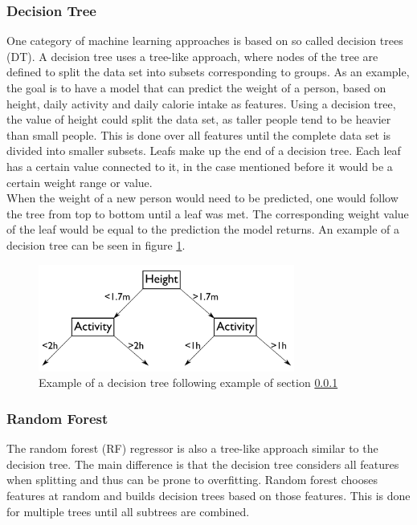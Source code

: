 \subsubsection{Decision Tree}
\label{sec:dt}
One category of machine learning approaches is based on so called decision trees (DT). A decision tree uses a tree-like approach, where nodes of the tree are defined to split the data set into subsets corresponding to groups. As an example, the goal is to have a model that can predict the weight of a person, based on height, daily activity and daily calorie intake as features. Using a decision tree, the value of height could split the data set, as taller people tend to be heavier than small people. This is done over all features until the complete data set is divided into smaller subsets. Leafs make up the end of a decision tree. Each leaf has a certain value connected to it, in the case mentioned before it would be a certain weight range or value. \\
When the weight of a new person would need to be predicted, one would follow the tree from top to bottom until a leaf was met. The corresponding weight value of the leaf would be equal to the prediction the model returns. An example of a decision tree can be seen in figure \ref{fig:dtdiag}.

\begin{figure}[h]
\centering
\includegraphics[width=0.75\textwidth]{figures/dtdiag}
\caption{Example of a decision tree following example of section \ref{sec:dt}}
\label{fig:dtdiag}
\end{figure}

\subsubsection{Random Forest}
The random forest (RF) regressor is also a tree-like approach similar to the decision tree. The main difference is that the decision tree considers all features when splitting and thus can be prone to overfitting. Random forest chooses features at random and builds decision trees based on those features. This is done for multiple trees until all subtrees are combined.

